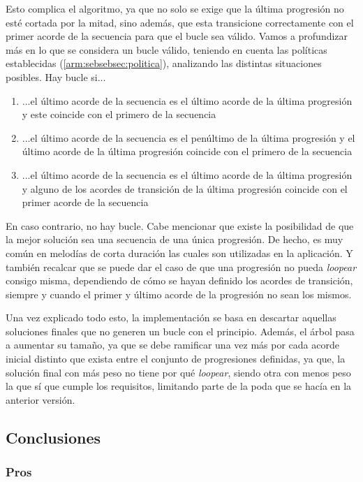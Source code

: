 Esto complica el algoritmo, ya que no solo se exige que la última progresión no esté cortada por la mitad, sino además, que esta transicione correctamente con el primer acorde de la secuencia para que el bucle sea válido. Vamos a profundizar más en lo que se considera un bucle válido, teniendo en cuenta las políticas establecidas (\ref{arm:sebsebsec:politica}), analizando las distintas situaciones posibles. Hay bucle si...

\begin{enumerate}[label={}]
    \item ...el último acorde de la secuencia es el último acorde de la última progresión y este coincide con el primero de la secuencia
    \item ...el último acorde de la secuencia es el penúltimo de la última progresión y el último acorde de la última progresión coincide con el primero de la secuencia
    \item ...el último acorde de la secuencia es el último acorde de la última progresión y alguno de los acordes de transición de la última progresión coincide con el primer acorde de la secuencia
\end{enumerate}

En caso contrario, no hay bucle. Cabe mencionar que existe la posibilidad de que la mejor solución sea una secuencia de una única progresión. De hecho, es muy común en melodías de corta duración las cuales son utilizadas en la aplicación. Y también recalcar que se puede dar el caso de que una progresión no pueda \textit{loopear} consigo misma, dependiendo de cómo se hayan definido los acordes de transición, siempre y cuando el primer y último acorde de la progresión no sean los mismos.

Una vez explicado todo esto, la implementación se basa en descartar aquellas soluciones finales que no generen un bucle con el principio. Además, el árbol pasa a aumentar su tamaño, ya que se debe ramificar una vez más por cada acorde inicial distinto que exista entre el conjunto de progresiones definidas, ya que, la solución final con más peso no tiene por qué \textit{loopear}, siendo otra con menos peso la que sí que cumple los requisitos, limitando parte de la poda que se hacía en la anterior versión.

\subsection{Conclusiones}

\subsubsection{Pros}

